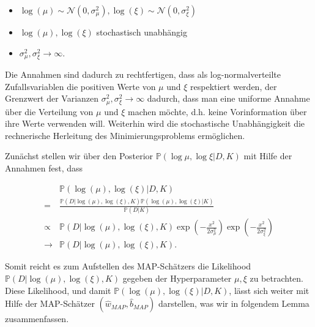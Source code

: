 \documentclass{report}
\theoremstyle{linebreak}
\begin{document}
\begin{itemize}
	\item $\log(\mu) \sim \mathcal{N}(0, \sigma_\mu^2), \log(\xi) \sim \mathcal{N}(0, 				  \sigma_\xi^2)$ 
	\item $\log(\mu), \log(\xi)$ stochastisch unabhängig
	\item $\sigma_\mu^2, \sigma_\xi^2 \rightarrow \infty$.
\end{itemize}

Die Annahmen sind dadurch zu rechtfertigen, dass als log-normalverteilte Zufallsvariablen die positiven Werte von $\mu$ und $\xi$ respektiert werden, der Grenzwert der Varianzen $\sigma_\mu^2, \sigma_\xi^2 \rightarrow \infty$ dadurch, dass man eine uniforme Annahme über die Verteilung von $\mu$ und $\xi$ machen möchte, d.h. keine Vorinformation über ihre Werte verwenden will. Weiterhin wird die stochastische Unabhängigkeit die rechnerische Herleitung des Minimierungsproblems ermöglichen.

Zunächst stellen wir über den Posterior $\mathbb{P}(\log \mu, \log \xi \vert D, K)$ mit Hilfe der Annahmen fest, dass

\begin{align*}
		& \mathbb{P}(\log(\mu), \log(\xi)\vert D, K)\\
	   =& \frac{\mathbb{P}(D\vert \log(\mu),\log(\xi),K)\mathbb{P}(\log(\mu), \log(\xi) 			  \vert K)}{\mathbb{P}(D\vert K)}  \\
\propto & \mathbb{P}(D\vert \log(\mu),\log(\xi),K)\exp(-\frac{x^2}{2\sigma_							  \mu^2})\exp(-\frac{x^2}{2\sigma_\xi^2})\\
\rightarrow & \mathbb{P}(D\vert \log(\mu),\log(\xi),K).
\end{align*}

Somit reicht es zum Aufstellen des MAP-Schätzers die Likelihood  $\mathbb{P}(D\vert \log(\mu),\log(\xi),K)$ gegeben der Hyperparameter $\mu, \xi$ zu betrachten. Diese Likelihood, und damit $\mathbb{P}(\log(\mu), \log(\xi)\vert D, K)$, lässt sich weiter mit Hilfe der MAP-Schätzer $(\hat{w}_{MAP}, \hat{b}_{MAP})$ darstellen, was wir in folgendem Lemma zusammenfassen.

\newpage
\end{document}
